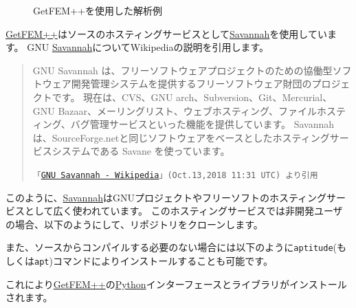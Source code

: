 \documentclass{../../style/ltjoc}
\begin{document}
\begin{figure}
{}
\caption{GetFEM++を使用した解析例}
\label{fig:getfem-tutorial}
\end{figure}

\href{http://getfem.org}{GetFEM++}はソースのホスティングサービスとして\href{https://savannah.gnu.org}{Savannah}を使用しています。
GNU \href{https://savannah.gnu.org}{Savannah}についてWikipediaの説明を引用します。
\begin{quote}
GNU Savannah は、フリーソフトウェアプロジェクトのための協働型ソフトウェア開発管理システムを提供するフリーソフトウェア財団のプロジェクトです。
現在は、CVS、GNU arch、Subversion、Git、Mercurial、GNU Bazaar、メーリングリスト、ウェブホスティング、ファイルホスティング、バグ管理サービスといった機能を提供しています。
Savannah は、SourceForge.netと同じソフトウェアをベースとしたホスティングサービスシステムである Savane を使っています。

\texttt{「\href{https://savannah.gnu.org}{GNU Savannah - Wikipedia}」(Oct.13,2018 11:31 UTC) より引用}
\end{quote}
このように、\href{https://savannah.gnu.org}{Savannah}はGNUプロジェクトやフリーソフトのホスティングサービスとして広く使われています。
このホスティングサービスでは非開発ユーザの場合、以下のようにして、リポジトリをクローンします。
\begin{shbox}
\end{shbox}
また、ソースからコンパイルする必要のない場合には以下のように\texttt{aptitude}(もしくは\texttt{apt})コマンドによりインストールすることも可能です。
\begin{shbox}
\end{shbox}
これにより\href{http://getfem.org}{GetFEM++}の\href{https://www.python.org/}{Python}インターフェースとライブラリがインストールされます。
\end{document}
